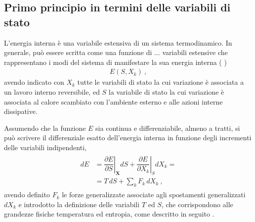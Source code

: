 \documentclass[letterpaper,10pt,italian]{jupyterBook}
\begin{document}
\subsection{Primo principio in termini delle variabili di stato}
\label{\detokenize{ch/thermodynamics/principles-gibbs-phase-rule:primo-principio-in-termini-delle-variabili-di-stato}}\label{\detokenize{ch/thermodynamics/principles-gibbs-phase-rule:physics-hs-thermodynamics-foundation-principles-gibbs-phase-rule-first}}
\sphinxAtStartPar
L’energia interna è una variabile estensiva di un sistema termodinamico. In generale, può essere scritta come una funzione di \(...\) variabili estensive che rappresentano i modi del sistema di manifestare la sua energia interna ( )
\begin{equation*}
\begin{split}E(S, X_k) \ ,\end{split}
\end{equation*}
\sphinxAtStartPar
avendo indicato con \(X_k\) tutte le variabili di stato la cui variazione è associata a un lavoro interno reversibile, ed \(S\) la variabile di stato la cui variazione è associata al calore scambiato con l’ambiente esterno e alle azioni interne dissipative.   

\sphinxAtStartPar
Assumendo che la funzione \(E\) sia continua e differenziabile, almeno a tratti, si può scrivere il differenziale \sphinxhyphen{} esatto \sphinxhyphen{} dell’energia interna in funzione degli incrementi delle variabili indipendenti,
\begin{equation*}
\begin{split}\begin{aligned}
dE & = \left. \dfrac{\partial E}{\partial S} \right|_{\mathbf{X}} d S 
     + \left. \dfrac{\partial E}{\partial X_k} \right|_{S} d X_k  = \\
   & = T \, d S + \sum_k F_k \, d X_k \ ,
\end{aligned}\end{split}
\end{equation*}
\sphinxAtStartPar
avendo definito \(F_k\) le forze generalizzate associate agli spostamenti generalizzati \(dX_k\) e introdotto la definizione delle variabili \(T\) ed \(S\), che corrispondono alle grandezze fisiche temperatura ed entropia, come descritto in seguito .
\end{document}
